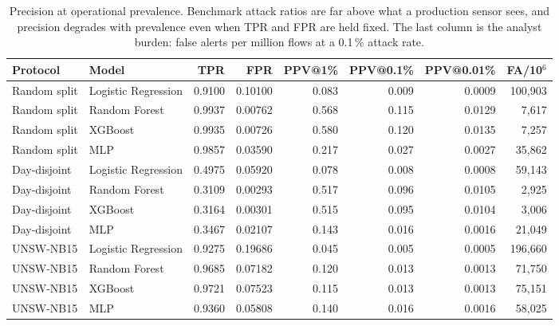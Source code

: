 \begin{table}[htbp]
\centering
\caption{Precision at operational prevalence. Benchmark attack ratios are far above what a production sensor sees, and precision degrades with prevalence even when TPR and FPR are held fixed. The last column is the analyst burden: false alerts per million flows at a 0.1\,\% attack rate.}
\label{tab:operational}
\scriptsize
\begin{tabular}{llrrrrrr}
\hline
Protocol & Model & TPR & FPR & PPV@1\% & PPV@0.1\% & PPV@0.01\% & FA/10$^6$ \\
\hline
Random split & Logistic Regression & 0.9100 & 0.10100 & 0.083 & 0.009 & 0.0009 & 100,903 \\
Random split & Random Forest & 0.9937 & 0.00762 & 0.568 & 0.115 & 0.0129 & 7,617 \\
Random split & XGBoost & 0.9935 & 0.00726 & 0.580 & 0.120 & 0.0135 & 7,257 \\
Random split & MLP & 0.9857 & 0.03590 & 0.217 & 0.027 & 0.0027 & 35,862 \\
Day-disjoint & Logistic Regression & 0.4975 & 0.05920 & 0.078 & 0.008 & 0.0008 & 59,143 \\
Day-disjoint & Random Forest & 0.3109 & 0.00293 & 0.517 & 0.096 & 0.0105 & 2,925 \\
Day-disjoint & XGBoost & 0.3164 & 0.00301 & 0.515 & 0.095 & 0.0104 & 3,006 \\
Day-disjoint & MLP & 0.3467 & 0.02107 & 0.143 & 0.016 & 0.0016 & 21,049 \\
UNSW-NB15 & Logistic Regression & 0.9275 & 0.19686 & 0.045 & 0.005 & 0.0005 & 196,660 \\
UNSW-NB15 & Random Forest & 0.9685 & 0.07182 & 0.120 & 0.013 & 0.0013 & 71,750 \\
UNSW-NB15 & XGBoost & 0.9721 & 0.07523 & 0.115 & 0.013 & 0.0013 & 75,151 \\
UNSW-NB15 & MLP & 0.9360 & 0.05808 & 0.140 & 0.016 & 0.0016 & 58,025 \\
\hline
\end{tabular}
\end{table}
